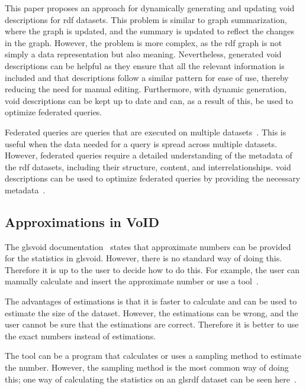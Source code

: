 This paper proposes an approach for dynamically generating and updating \gls{void} descriptions for \gls{rdf} datasets. This problem is similar to graph summarization, where the graph is updated, and the summary is updated to reflect the changes in the graph. However, the problem is more complex, as the \gls{rdf} graph is not simply a data representation but also meaning. Nevertheless, generated \gls{void} descriptions can be helpful as they ensure that all the relevant information is included and that descriptions follow a similar pattern for ease of use, thereby reducing the need for manual editing. Furthermore, with dynamic generation, \gls{void} descriptions can be kept up to date and can, as a result of this, be used to optimize federated queries.

Federated queries are queries that are executed on multiple datasets~\cite{intro-federated-query}. This is useful when the data needed for a query is spread across multiple datasets. However, federated queries require a detailed understanding of the metadata of the \gls{rdf} datasets, including their structure, content, and interrelationships. \gls{void} descriptions can be used to optimize federated queries by providing the necessary metadata~\cite{rdf-federated-query}.

\subsection{Approximations in VoID} \label{sec:approximations}
The gls{void} documentation~\cite{documentation-void} states that approximate numbers can be provided for the statistics in gls{void}.
However, there is no standard way of doing this. Therefore it is up to the user to decide how to do this. For example, the user can manually calculate and insert the approximate number or use a tool~\cite{the-web-of-data}.

The advantages of estimations is that it is faster to calculate and can be used to estimate the size of the dataset. However, the estimations can be wrong, and the user cannot be sure that the estimations are correct. Therefore it is better to use the exact numbers instead of estimations.

The tool can be a program that calculates or uses a sampling method to estimate the number. However, the sampling method is the most common way of doing this; one way of calculating the statistics on an gls{rdf} dataset can be seen here~\cite{zneika2016rdf}.

